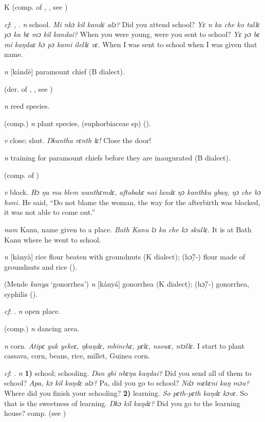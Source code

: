\begin{letter}{K}
 (comp. of , , see ) 

 \textit{cf}: , . \textit{n} school. \textit{Mi nkɔ kil kandɛ alɔ?} Did you attend school? \textit{Yɛ n ka che ko tallɛ pɔ ka bɛ mɔ kil kandai?} When you were young, were you sent to school? \textit{Yɛ pɔ bɛ mi kaŋdaɛ hɔ pɔ kami ilellɛ vɛ.} When I was sent to school when I was given that name.

 \textit{n} [kándè] paramount chief (B dialect). 

 (der. of , , see ) 

 \textit{n} reed species.

 (comp.) \textit{n} plant species, (euphorbiaceae sp) (\citealt{Pichl1967}). 

 \textit{v} close; shut. \textit{Ŋkantha rɛnth lɛ!} Close the door!

 \textit{n} training for paramount chiefs before they are inaugurated (B dialect).

 (comp. of ) 

 \textit{v} block. \textit{Hɔ ŋa ma blem wanthɛmdɛ, aftabakɛ nai landɛ ŋɔ kanthka gbaŋ, ŋɔ che bɔ honi.} He said, “Do not blame the woman, the way for the afterbirth was blocked, it was not able to come out.”

 \textit{nam} Kanu, name given to a place. \textit{Bath Kanu lɔ ka che kɔ skullɛ.} It is at Bath Kanu where he went to school.

 \textit{n} [kànyà] rice flour beaten with groundnuts (K dialect); (hɔ̃/-) flour made of groundnuts and rice (\citealt{Pichl1967}).

 (Mende \textit{kanya} ‘gonorrhea') \textit{n} [kányá] gonorrhea (K dialect); (hɔ̃/-) gonorrhea, syphilis (\citealt{Pichl1967}).

 \textit{cf}: . \textit{n} open place.

 (comp.) \textit{n} dancing area.

 \textit{n} corn. \textit{Atipɛ yuk yekeɛ, ŋkaŋdɛ, mbinchɛ, pɛlɛ, nsowɛ, ntɔllɛ.} I start to plant cassava, corn, beans, rice, millet, Guinea corn.

 \textit{cf}: . \textit{n} \textbf{1)} school; schooling. \textit{Ŋan gbi nbɛŋa kaŋdai?} Did you send all of them to school? \textit{Apa, kɔ kil kaŋdɛ alɔ?} Pa, did you go to school? \textit{Ndɔ mɛkɛni kaŋ mɔa?} Where did you finish your schooling? \textbf{2)} learning. \textit{So pɛth-pɛth kaŋdɛ kɔvɛ.} So that is the sweetness of learning. \textit{Ŋkɔ kil kaŋdɛ?} Did you go to the learning house? comp.  (see ) 


\end{letter}
